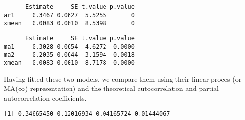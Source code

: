 \documentclass[]{book}
\newenvironment{Shaded}{\begin{snugshade}}{\end{snugshade}}
\newcommand{\CommentTok}[1]{\textcolor[rgb]{0.56,0.35,0.01}{\textit{#1}}}
\newcommand{\DataTypeTok}[1]{\textcolor[rgb]{0.13,0.29,0.53}{#1}}
\newcommand{\DecValTok}[1]{\textcolor[rgb]{0.00,0.00,0.81}{#1}}
\newcommand{\KeywordTok}[1]{\textcolor[rgb]{0.13,0.29,0.53}{\textbf{#1}}}
\newcommand{\NormalTok}[1]{#1}
\newcommand{\OperatorTok}[1]{\textcolor[rgb]{0.81,0.36,0.00}{\textbf{#1}}}
\newcommand{\OtherTok}[1]{\textcolor[rgb]{0.56,0.35,0.01}{#1}}
\newcommand{\StringTok}[1]{\textcolor[rgb]{0.31,0.60,0.02}{#1}}
\begin{document}
\begin{verbatim}
      Estimate     SE t.value p.value
ar1     0.3467 0.0627  5.5255       0
xmean   0.0083 0.0010  8.5398       0
\end{verbatim}

\begin{Shaded}
\end{Shaded}

\begin{verbatim}
      Estimate     SE t.value p.value
ma1     0.3028 0.0654  4.6272  0.0000
ma2     0.2035 0.0644  3.1594  0.0018
xmean   0.0083 0.0010  8.7178  0.0000
\end{verbatim}

Having fitted these two models, we compare them using their linear proces (or MA(\(\infty\)) representation) and the theoretical autocorrelation and partial autocorrelation coefficients.

\begin{Shaded}
\end{Shaded}

\begin{verbatim}
[1] 0.34665450 0.12016934 0.04165724 0.01444067
\end{verbatim}
\end{document}
